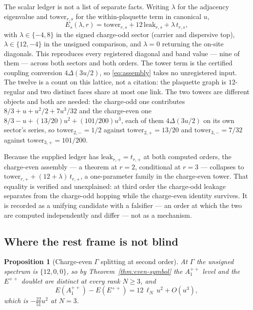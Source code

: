 \documentclass[11pt]{article}
\theoremstyle{plain}
\newtheorem{proposition}[theorem]{Proposition}
\theoremstyle{definition}
\theoremstyle{remark}
\newcommand{\chk}[1]{}
\begin{document}
The scalar ledger is not a list of separate facts. Writing $\lambda$ for the
adjacency eigenvalue and $\mathrm{tower}_{r,s}$ for the within-plaquette term
in canonical $u$,
\begin{equation}\label{eq:assembly}
  E_s(\lambda,r)=\mathrm{tower}_{r,s}+12\,\mathrm{leak}_{r,s}+\lambda\,t_{r,s},
\end{equation}
with $\lambda\in\{-4,8\}$ in the signed charge-odd sector (carrier and dispersive
top), $\lambda\in\{12,-4\}$ in the unsigned comparison, and $\lambda=0$
returning the on-site diagonals. This reproduces every registered diagonal
and band value --- nine of them --- across both sectors and both orders. The
tower term is the certified coupling conversion $4\Delta(3u/2)$, so
\eqref{eq:assembly} takes no unregistered input. The twelve is a count on this
lattice, not a citation: the plaquette graph is $12$-regular and two distinct
faces share at most one link. The two towers are different objects and both
are needed: the charge-odd one contributes
$8/3+u+u^2/2+7u^3/32$ and the charge-even one $8/3-u+(13/20)u^2+(101/200)u^3$,
each of them $4\Delta(3u/2)$ on its own sector's series, so
$\mathrm{tower}_{2,-}=1/2$ against $\mathrm{tower}_{2,+}=13/20$ and
$\mathrm{tower}_{3,-}=7/32$ against $\mathrm{tower}_{3,+}=101/200$.
\chk{one assembly formula gives every registered band value}
\chk{one assembly formula gives every C-even value at both orders}
\chk{the plaquette graph is 12-regular and two faces share at most one link}

Because the supplied ledger has $\mathrm{leak}_{r,+}=t_{r,+}$ at both computed
orders, the charge-even assembly --- a theorem at $r=2$, conditional at
$r=3$ --- collapses to
$\mathrm{tower}_{r,+}+(12+\lambda)\,t_{r,+}$, a one-parameter family in the
charge-even tower. That
equality is verified and unexplained: at third order the charge-odd leakage
separates from the charge-odd hopping while the charge-even identity survives.
It is recorded as a unifying candidate with a falsifier --- an order at which
the two are computed independently and differ --- not as a mechanism.
\chk{both declared coincidences, checked: one is ell\_N at all ranks, the other is bare}

\subsection{Where the rest frame is not blind}

\begin{proposition}[Charge-even $\Gamma$ splitting at second order]\label{prop:evengamma}
At $\Gamma$ the unsigned spectrum is $\{12,0,0\}$, so by
Theorem~\ref{thm:even-symbol} the $A_1^{++}$ level and the $E^{++}$ doublet
are distinct at every rank $N\ge3$, and
\[
  E(A_1^{++})-E(E^{++})=12\,\ell_N\,u^2+O(u^3),
\]
which is $-\tfrac{22}{51}u^2$ at $N=3$.
\end{proposition}
\end{document}

